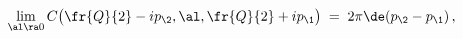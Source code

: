\begin{equation}
\lim_{\al\ra 0}C\big(\fr{Q}{2}-ip_\2,\al,\fr{Q}{2}+ip_\1\big)\;=\;
2\pi\de(p_\2-p_\1)\, ,
\end{equation}


